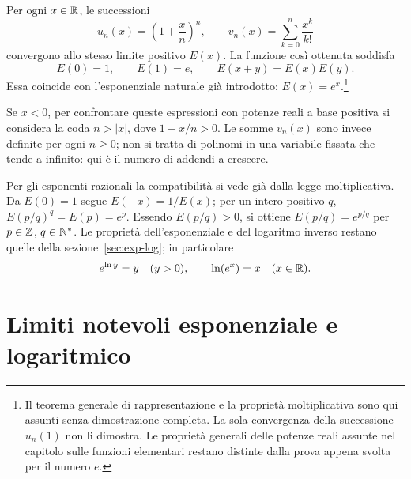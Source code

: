 \begin{teorema}
\label{teo:rappresentazione-exp}
Per ogni $x\in\mathbb{R}$, le successioni
\[
u_n(x)=\left(1+\frac xn\right)^n,
\qquad
v_n(x)=\sum_{k=0}^n\frac{x^k}{k!}
\]
convergono allo stesso limite positivo $E(x)$. La funzione così ottenuta soddisfa
\[
E(0)=1,\qquad E(1)=e,\qquad E(x+y)=E(x)E(y).
\]
Essa coincide con l'esponenziale naturale già introdotto: $E(x)=e^x$.\footnote{Il teorema generale di rappresentazione e la proprietà moltiplicativa sono qui assunti senza dimostrazione completa. La sola convergenza della successione $u_n(1)$ non li dimostra. Le proprietà generali delle potenze reali assunte nel capitolo sulle funzioni elementari restano distinte dalla prova appena svolta per il numero $e$.}
\end{teorema}

Se $x<0$, per confrontare queste espressioni con potenze reali a base positiva si considera la coda $n>|x|$, dove $1+x/n>0$. Le somme $v_n(x)$ sono invece definite per ogni $n\ge0$; non si tratta di polinomi in una variabile fissata che tende a infinito: qui è il numero di addendi a crescere.

Per gli esponenti razionali la compatibilità si vede già dalla legge moltiplicativa. Da $E(0)=1$ segue $E(-x)=1/E(x)$; per un intero positivo $q$, $E(p/q)^q=E(p)=e^p$. Essendo $E(p/q)>0$, si ottiene $E(p/q)=e^{p/q}$ per $p\in\mathbb{Z}$, $q\in\mathbb{N}^*$. Le proprietà dell'esponenziale e del logaritmo inverso restano quelle della sezione~\ref{sec:exp-log}; in particolare
\[
e^{\ln y}=y\quad(y>0),\qquad \ln(e^x)=x\quad(x\in\mathbb{R}).
\]

\section{Limiti notevoli esponenziale e logaritmico}

